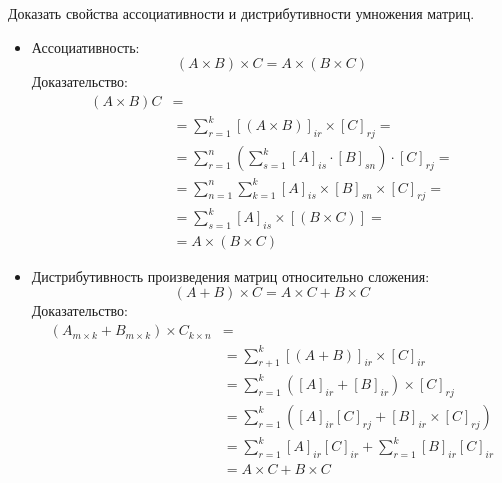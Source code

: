 \begin{question}
  Доказать свойства ассоциативности и дистрибутивности умножения матриц.
\end{question} 
\begin{answer}
  \begin{itemize}
    \item Ассоциативность: \[
      (A \times B) \times C = A \times (B \times C) 
    \] 
    Доказательство:
    \begin{align*}
      \left( A \times  B \right) C &= \\
      &= \sum_{r=1}^{k} [(A \times B)]_{ir} \times [C]_{rj} = \\
      &= \sum_{r=1}^{n} \left( \sum_{s=1}^{k} [A]_{is} \cdot [B]_{sn} \right) \cdot [C]_{rj} = \\
      &= \sum_{n=1}^{n} \sum_{k=1}^{k} [A]_{is} \times [B]_{sn} \times [C]_{rj} = \\
      &= \sum_{s=1}^{k} [A]_{is} \times [\left( B \times C \right) ] =\\
      &= A \times (B \times C)
    \end{align*}

  \item Дистрибутивность произведения матриц относительно сложения: \[
      (A + B) \times C = A \times C + B \times C
    \] 
    Доказательство:
    \begin{align*}
      \left(A_{m \times k} + B_{m \times k}\right) \times C_{k \times n} &= \\
      &= \sum_{r+1}^{k} [\left( A + B \right) ]_{ir} \times [C]_{ir} \\
      &= \sum_{r=1}^{k} \left( [A]_{ir} + [B]_{ir} \right) \times [C]_{rj} \\
      &= \sum_{r=1}^{k} \left( [A]_{ir} [C]_{rj} + [B]_{ir} \times [C]_{rj} \right) \\
      &= \sum_{r=1}^{k} [A]_{ir} [C]_{ir} + \sum_{r=1}^{k} [B]_{ir} [C]_{ir} \\
      &= A \times C + B \times C
    \end{align*}
  \end{itemize}
\end{answer} 


